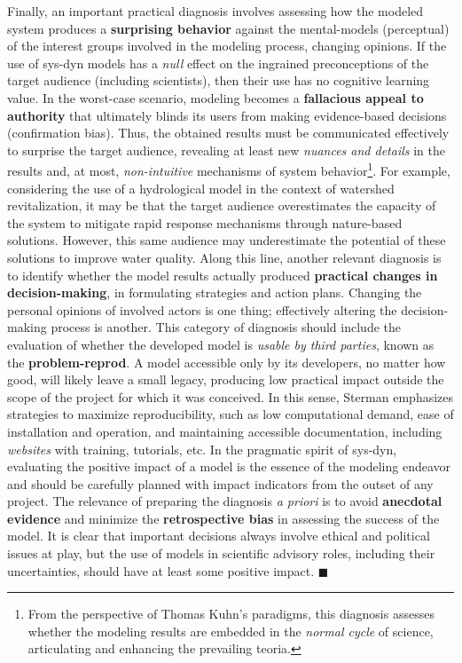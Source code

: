\documentclass[./main_en.tex]{subfiles}
\begin{document}
\par Finally, an important practical diagnosis involves assessing how the modeled \gls{system} produces a \textbf{surprising behavior} against the \gls{mental-models} (perceptual) of the interest groups involved in the modeling process, changing opinions. If the use of \gls{sys-dyn} models has a \textit{null} effect on the ingrained preconceptions of the target audience (including scientists), then their use has no cognitive learning value. In the worst-case scenario, modeling becomes a \textbf{fallacious appeal to authority} that ultimately blinds its users from making evidence-based decisions (confirmation bias). Thus, the obtained results must be communicated effectively to surprise the target audience, revealing at least new \textit{nuances and details} in the results and, at most, \textit{non-intuitive} mechanisms of system behavior\footnote{From the perspective of Thomas Kuhn's paradigms, this diagnosis assesses whether the modeling results are embedded in the \textit{normal cycle} of science, articulating and enhancing the prevailing \gls{teoria}.}. For example, considering the use of a hydrological \gls{model} in the context of watershed revitalization, it may be that the target audience overestimates the capacity of the \gls{system} to mitigate rapid response mechanisms through nature-based solutions. However, this same audience may underestimate the potential of these solutions to improve water quality. Along this line, another relevant diagnosis is to identify whether the \gls{model} results actually produced \textbf{practical changes in decision-making}, in formulating strategies and action plans. Changing the personal opinions of involved actors is one thing; effectively altering the decision-making process is another. This category of diagnosis should include the evaluation of whether the developed \gls{model} is \textit{usable by third parties}, known as the \textbf{\gls{problem-reprod}}. A \gls{model} accessible only by its developers, no matter how good, will likely leave a small legacy, producing low practical impact outside the scope of the project for which it was conceived. In this sense, Sterman emphasizes strategies to maximize reproducibility, such as low computational demand, ease of installation and operation, and maintaining accessible documentation, including \textit{websites} with training, tutorials, etc. In the pragmatic spirit of \gls{sys-dyn}, evaluating the positive impact of a \gls{model} is the essence of the modeling endeavor and should be carefully planned with impact indicators from the outset of any project. The relevance of preparing the diagnosis \textit{a priori} is to avoid \textbf{anecdotal evidence} and minimize the \textbf{retrospective bias} in assessing the success of the \gls{model}. It is clear that important decisions always involve ethical and political issues at play, but the use of models in scientific advisory roles, including their uncertainties, should have at least some positive impact. $\blacksquare$
\end{document}
